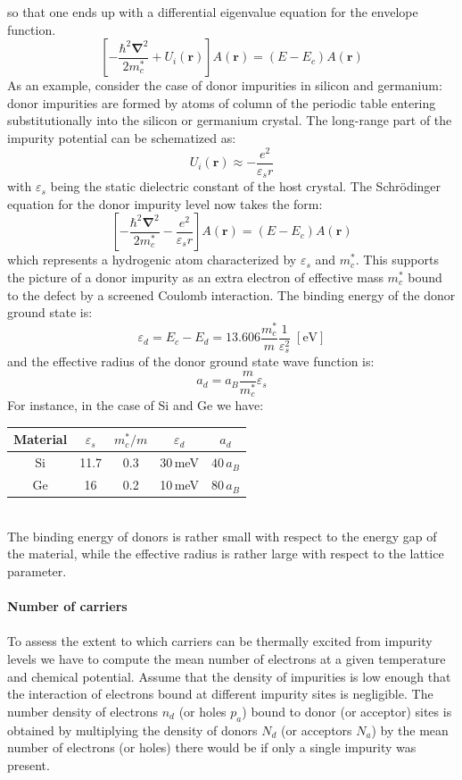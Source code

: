 \documentclass[10.75pt,a4paper,openright,bottom=2cm]{article}
\renewcommand{\Vec}[1]{\boldsymbol{#1}}
\newcommand{\RN}[1]{%
  \textup{\uppercase\expandafter{\romannumeral#1}}%
}
\begin{document}
so that one ends up with a differential eigenvalue equation for the envelope function.
\[
\left[-\frac{\hbar^2\Vec{\nabla}^2}{2m_c^*}+U_i(\Vec{r})\right]A(\Vec{r})=(E-E_c)A(\Vec{r})
\]
As an example, consider the case of donor impurities in silicon and germanium: donor impurities are formed by atoms of column \RN{5} of the periodic table entering substitutionally into the silicon or germanium crystal. The long-range part of the impurity potential can be schematized as:
\[
U_i(\Vec{r})\approx-\frac{e^2}{\varepsilon_sr}
\]
with $\varepsilon_s$ being the static dielectric constant of the host crystal. The Schr\"odinger equation for the donor impurity level now takes the form:
\[
\left[-\frac{\hbar^2\Vec{\nabla}^2}{2m_c^*}-\frac{e^2}{\varepsilon_sr}\right]A(\Vec{r})=(E-E_c)A(\Vec{r})
\]
which represents a hydrogenic atom characterized by $\varepsilon_s$ and $m_c^*$. This supports the picture of a donor impurity as an extra electron of effective mass $m_c^*$ bound to the defect by a screened Coulomb interaction. The binding energy of the donor ground state is:
\[
\varepsilon_d=E_c-E_d=13.606\frac{m_c^*}{m}\frac{1}{\varepsilon_s^2}\;[\text{eV}]
\]
and the effective radius of the donor ground state wave function is:
\[
a_d=a_B\frac{m}{m_c^*}\varepsilon_s
\]
For instance, in the case of Si and Ge we have:
\begin{table}[h]
    \centering
    \begin{tabular}{c|cccc}
    \hline
    Material & $\varepsilon_s$ & $m_c^*/m$ & $\varepsilon_d$ & $a_d$ \\
    \hline\hline
    Si & 11.7 & 0.3 & 30\,meV & $40\,a_B$\\
    Ge & 16 & 0.2 & 10\,meV & $80\,a_B$\\
    \hline
    \end{tabular}
\end{table}\\
\noindent The binding energy of donors is rather small with respect to the energy gap of the material, while the effective radius is rather large with respect to the lattice parameter.\\\\
\textbf{Number of carriers}\\\\
To assess the extent to which carriers can be thermally excited from impurity levels we have to compute the mean number of electrons at a given temperature and chemical potential. Assume that the density of impurities is low enough that the interaction of electrons bound at different impurity sites is negligible. The number density of electrons $n_d$ (or holes $p_a$) bound to donor (or acceptor) sites is obtained by multiplying the density of donors $N_d$ (or acceptors $N_a$) by the mean number of electrons (or holes) there would be if only a single impurity was present.\\
\end{document}
